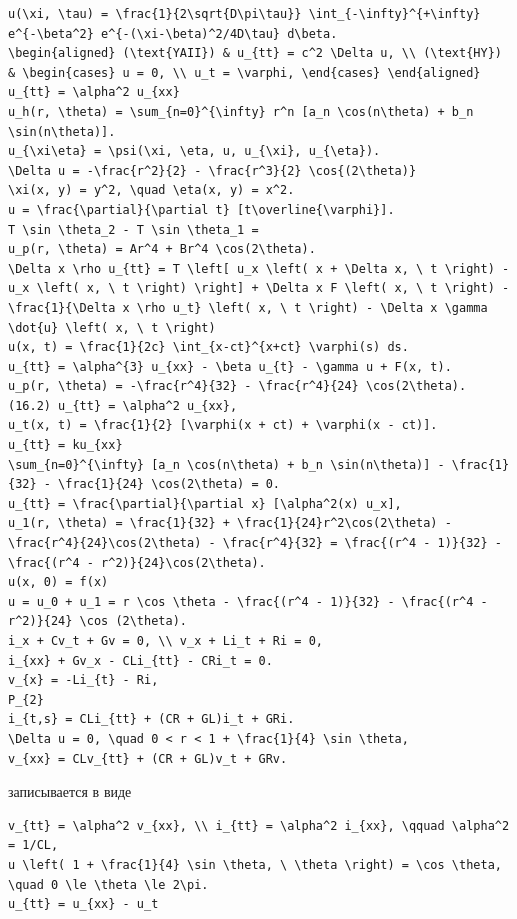 \documentclass[
  ukrainian,
]{article}
\begin{document}
\begin{verbatim}
u(\xi, \tau) = \frac{1}{2\sqrt{D\pi\tau}} \int_{-\infty}^{+\infty} e^{-\beta^2} e^{-(\xi-\beta)^2/4D\tau} d\beta.
\begin{aligned} (\text{YAII}) & u_{tt} = c^2 \Delta u, \\ (\text{HY}) & \begin{cases} u = 0, \\ u_t = \varphi, \end{cases} \end{aligned}
u_{tt} = \alpha^2 u_{xx}
u_h(r, \theta) = \sum_{n=0}^{\infty} r^n [a_n \cos(n\theta) + b_n \sin(n\theta)].
u_{\xi\eta} = \psi(\xi, \eta, u, u_{\xi}, u_{\eta}).
\Delta u = -\frac{r^2}{2} - \frac{r^3}{2} \cos{(2\theta)}
\xi(x, y) = y^2, \quad \eta(x, y) = x^2.
u = \frac{\partial}{\partial t} [t\overline{\varphi}].
T \sin \theta_2 - T \sin \theta_1 =
u_p(r, \theta) = Ar^4 + Br^4 \cos(2\theta).
\Delta x \rho u_{tt} = T \left[ u_x \left( x + \Delta x, \ t \right) - u_x \left( x, \ t \right) \right] + \Delta x F \left( x, \ t \right) - \frac{1}{\Delta x \rho u_t} \left( x, \ t \right) - \Delta x \gamma \dot{u} \left( x, \ t \right)
u(x, t) = \frac{1}{2c} \int_{x-ct}^{x+ct} \varphi(s) ds.
u_{tt} = \alpha^{3} u_{xx} - \beta u_{t} - \gamma u + F(x, t).
u_p(r, \theta) = -\frac{r^4}{32} - \frac{r^4}{24} \cos(2\theta).
(16.2) u_{tt} = \alpha^2 u_{xx},
u_t(x, t) = \frac{1}{2} [\varphi(x + ct) + \varphi(x - ct)].
u_{tt} = ku_{xx}
\sum_{n=0}^{\infty} [a_n \cos(n\theta) + b_n \sin(n\theta)] - \frac{1}{32} - \frac{1}{24} \cos(2\theta) = 0.
u_{tt} = \frac{\partial}{\partial x} [\alpha^2(x) u_x],
u_1(r, \theta) = \frac{1}{32} + \frac{1}{24}r^2\cos(2\theta) - \frac{r^4}{24}\cos(2\theta) - \frac{r^4}{32} = \frac{(r^4 - 1)}{32} - \frac{(r^4 - r^2)}{24}\cos(2\theta).
u(x, 0) = f(x)
u = u_0 + u_1 = r \cos \theta - \frac{(r^4 - 1)}{32} - \frac{(r^4 - r^2)}{24} \cos (2\theta).
i_x + Cv_t + Gv = 0, \\ v_x + Li_t + Ri = 0,
i_{xx} + Gv_x - CLi_{tt} - CRi_t = 0.
v_{x} = -Li_{t} - Ri,
P_{2}
i_{t,s} = CLi_{tt} + (CR + GL)i_t + GRi.
\Delta u = 0, \quad 0 < r < 1 + \frac{1}{4} \sin \theta,
v_{xx} = CLv_{tt} + (CR + GL)v_t + GRv.
\end{verbatim}

записывается в виде

\begin{verbatim}
v_{tt} = \alpha^2 v_{xx}, \\ i_{tt} = \alpha^2 i_{xx}, \qquad \alpha^2 = 1/CL,
u \left( 1 + \frac{1}{4} \sin \theta, \ \theta \right) = \cos \theta, \quad 0 \le \theta \le 2\pi.
u_{tt} = u_{xx} - u_t
\end{verbatim}
\end{document}
